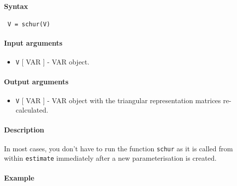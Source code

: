 


	\paragraph{Syntax}
 
 \begin{verbatim}
 V = schur(V)
 \end{verbatim}
 
 \paragraph{Input arguments}
 
 \begin{itemize}
 \item
   \texttt{V} {[} VAR {]} - VAR object.
 \end{itemize}
 
 \paragraph{Output arguments}
 
 \begin{itemize}
 \item
   \texttt{V} {[} VAR {]} - VAR object with the triangular representation
   matrices re-calculated.
 \end{itemize}
 
 \paragraph{Description}
 
 In most cases, you don't have to run the function \texttt{schur} as it
 is called from within \texttt{estimate} immediately after a new
 parameterisation is created.
 
 \paragraph{Example}


